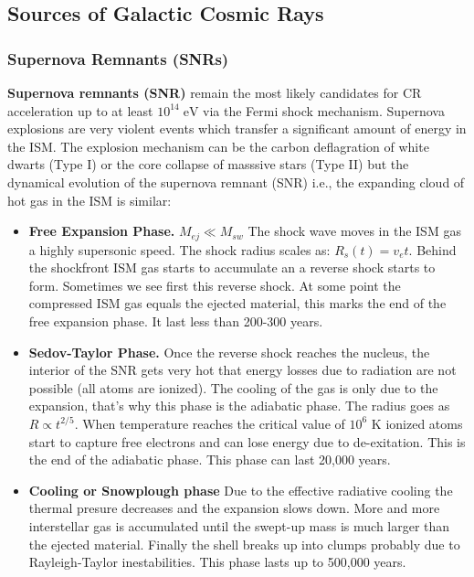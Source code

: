 \documentclass[
  letterpaper,
  DIV=11,
  numbers=noendperiod]{scrreprt}
\begin{document}
\subsection{Sources of Galactic Cosmic
Rays}\label{sources-of-galactic-cosmic-rays}

\subsubsection{Supernova Remnants (SNRs)}\label{supernova-remnants-snrs}

\textbf{Supernova remnants (SNR)} remain the most likely candidates for
CR acceleration up to at least \(10^{14} \mathrm{ \; eV}\) via the Fermi
shock mechanism. Supernova explosions are very violent events which
transfer a significant amount of energy in the ISM. The explosion
mechanism can be the carbon deflagration of white dwarts (Type I) or the
core collapse of masssive stars (Type II) but the dynamical evolution of
the supernova remnant (SNR) i.e., the expanding cloud of hot gas in the
ISM is similar:

\begin{itemize}
\item
  \textbf{Free Expansion Phase.} \(M_{ej} \ll M_{sw}\) The shock wave
  moves in the ISM gas a highly supersonic speed. The shock radius
  scales as: \(R_s(t) = v_e t\). Behind the shockfront ISM gas starts to
  accumulate an a reverse shock starts to form. Sometimes we see first
  this reverse shock. At some point the compressed ISM gas equals the
  ejected material, this marks the end of the free expansion phase. It
  last less than 200-300 years.
\item
  \textbf{Sedov-Taylor Phase.} Once the reverse shock reaches the
  nucleus, the interior of the SNR gets very hot that energy losses due
  to radiation are not possible (all atoms are ionized). The cooling of
  the gas is only due to the expansion, that's why this phase is the
  adiabatic phase. The radius goes as \(R \propto t^{2/5}\). When
  temperature reaches the critical value of \(10^{6}\) K ionized atoms
  start to capture free electrons and can lose energy due to
  de-exitation. This is the end of the adiabatic phase. This phase can
  last 20,000 years.
\item
  \textbf{Cooling or Snowplough phase} Due to the effective radiative
  cooling the thermal presure decreases and the expansion slows down.
  More and more interstellar gas is accumulated until the swept-up mass
  is much larger than the ejected material. Finally the shell breaks up
  into clumps probably due to Rayleigh-Taylor inestabilities. This phase
  lasts up to 500,000 years.
\end{itemize}
\end{document}
